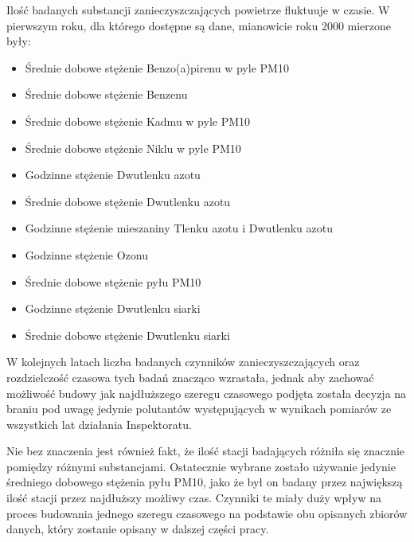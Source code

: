 \documentclass[10pt,a4paper]{article}
\begin{document}
Ilość badanych substancji zanieczyszczających powietrze fluktuuje w czasie. W pierwszym roku, dla którego dostępne są dane, mianowicie roku 2000 mierzone były:
\begin{itemize}
	\item Średnie dobowe stężenie Benzo(a)pirenu w pyle PM10
	\item Średnie dobowe stężenie Benzenu
	\item Średnie dobowe stężenie Kadmu w pyle PM10 
	\item Średnie dobowe stężenie Niklu w pyle PM10
	\item Godzinne stężenie Dwutlenku azotu
	\item Średnie dobowe stężenie Dwutlenku azotu
	\item Godzinne stężenie mieszaniny Tlenku azotu i Dwutlenku azotu
	\item Godzinne stężenie Ozonu
	\item Średnie dobowe stężenie pyłu PM10
	\item Godzinne stężenie Dwutlenku siarki
	\item Średnie dobowe stężenie Dwutlenku siarki
\end{itemize}
W kolejnych latach liczba badanych czynników zanieczyszczających oraz rozdzielczość czasowa tych badań znacząco wzrastała, jednak aby zachować możliwość budowy jak najdłuższego szeregu czasowego podjęta została decyzja na braniu pod uwagę jedynie polutantów występujących w wynikach pomiarów ze wszystkich lat działania Inspektoratu. 


Nie bez znaczenia jest również fakt, że ilość stacji badających różniła się znacznie pomiędzy różnymi substancjami. Ostatecznie wybrane zostało używanie jedynie średniego dobowego stężenia pyłu PM10, jako że był on badany przez największą ilość stacji przez najdłuższy możliwy czas. Czynniki te miały duży wpływ na proces budowania jednego szeregu czasowego na podstawie obu opisanych zbiorów danych, który zostanie opisany w dalszej części pracy.
\end{document}
